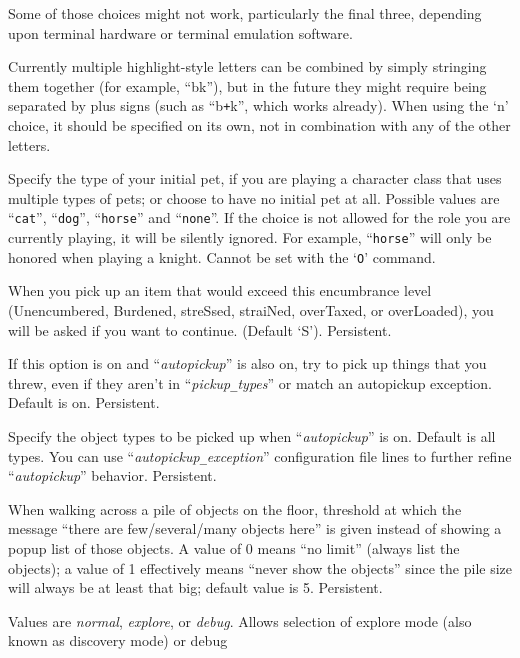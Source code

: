 Some of those choices might not work, particularly the final three,
depending upon terminal hardware or terminal emulation software.

Currently multiple highlight-style letters can be combined by simply
stringing them together (for example, ``bk''), but in the future
they might require being separated by plus signs (such as ``b\verb&+&k'',
which works already).
When using the `n' choice, it should be specified on its own,
not in combination with any of the other letters.

\item[\ib{pettype}]
Specify the type of your initial pet, if you are playing a character class
that uses multiple types of pets; or choose to have no initial pet at all.
Possible values are ``{\tt cat}'', ``{\tt dog}'', ``{\tt horse}''
and ``{\tt none}''.
If the choice is not allowed for the role you are currently playing,
it will be silently ignored.  For example, ``{\tt horse}'' will only be
honored when playing a knight.
Cannot be set with the `{\tt O}' command.
\item[\ib{pickup\verb+_+burden}]
When you pick up an item that would exceed this encumbrance
level (Unencumbered, Burdened, streSsed, straiNed, overTaxed,
or overLoaded), you will be asked if you want to continue.
(Default `S').  Persistent.
\item[\ib{pickup\verb+_+thrown}]
If this option is on and ``{\it autopickup\/}'' is also on, try to pick up
things that you threw, even if they aren't in
``{\it pickup\verb+_+types\/}'' or
match an autopickup exception.  Default is on.  Persistent.
\item[\ib{pickup\verb+_+types}]
Specify the object types to be picked up when ``{\it autopickup\/}''
is on.  Default is all types.  You can use
``{\it autopickup\verb+_+exception\/}''
configuration file lines to further refine ``{\it autopickup\/}'' behavior.
Persistent.
\item[\ib{pile\verb+_+limit}]
When walking across a pile of objects on the floor, threshold at which
the message ``there are few/several/many objects here'' is given instead
of showing a popup list of those objects.  A value of 0 means ``no limit''
(always list the objects); a value of 1 effectively means ``never show
the objects'' since the pile size will always be at least that big;
default value is 5.  Persistent.
\item[\ib{playmode}]
Values are {\it normal\/}, {\it explore\/}, or {\it debug\/}.
Allows selection of explore mode (also known as discovery mode) or debug
